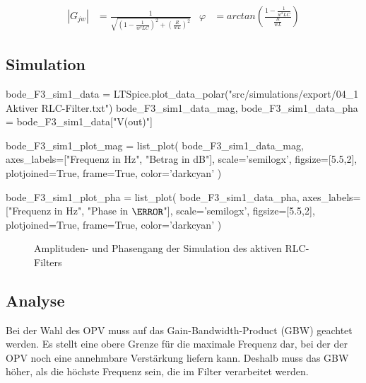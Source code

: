 \begin{align*}
    |G_{jw}| & = \frac{1}{\sqrt{(1 - \frac{1}{w^2LC})^2 + (\frac{R}{wL})^2}} &
    \varphi &= arctan(\frac{1 - \frac{1}{w^2LC}}{\frac{R}{wL}})
\end{align*}

\subsection{Simulation}

\begin{sagesilent}
    bode_F3_sim1_data = LTSpice.plot_data_polar("src/simulations/export/04_1 Aktiver RLC-Filter.txt")
    bode_F3_sim1_data_mag, bode_F3_sim1_data_pha = bode_F3_sim1_data["V(out)"]

    bode_F3_sim1_plot_mag = list_plot(
        bode_F3_sim1_data_mag,
        axes_labels=["Frequenz in Hz", "Betrag in dB"],
        scale='semilogx',
        figsize=[5.5,2],
        plotjoined=True,
        frame=True,
        color='darkcyan'
    )

    bode_F3_sim1_plot_pha = list_plot(
        bode_F3_sim1_data_pha,
        axes_labels=["Frequenz in Hz", "Phase in $\degree$"],
        scale='semilogx',
        figsize=[5.5,2],
        plotjoined=True,
        frame=True,
        color='darkcyan'
    )
\end{sagesilent}

\begin{figure}[H]
    \centering
    \begin{subfigure}{\textwidth}
        \centering
    \end{subfigure}
    \quad
    \begin{subfigure}{\textwidth}
        \centering
    \end{subfigure}
    \caption{Amplituden- und Phasengang der Simulation des aktiven RLC-Filters}
    \label{fig:F3_Sim1}
\end{figure}

\subsection{Analyse}

Bei der Wahl des OPV muss auf das Gain-Bandwidth-Product (GBW) geachtet werden.
Es stellt eine obere Grenze für die maximale Frequenz dar, bei der der OPV noch eine annehmbare Verstärkung liefern kann.
Deshalb muss das GBW höher, als die höchste Frequenz sein, die im Filter verarbeitet werden.

